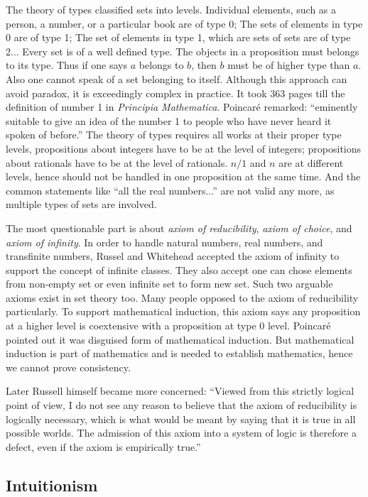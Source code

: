 \documentclass{article}
\begin{document}
The theory of types classified sets into levels. Individual elements, such as a person, a number, or a particular book are of type 0; The sets of elements in type 0 are of type 1; The set of elements in type 1, which are sets of sets are of type 2... Every set is of a well defined type. The objects in a proposition must belongs to its type. Thus if one says $a$ belongs to $b$, then $b$ must be of higher type than $a$. Also one cannot speak of a set belonging to itself. Although this approach can avoid paradox, it is exceedingly complex in practice. It took 363 pages till the definition of number 1 in {\em Principia Mathematica}. Poincaré remarked: ``eminently suitable to give an idea of the number 1 to people who have never heard it spoken of before.'' The theory of types requires all works at their proper type levels, propositions about integers have to be at the level of integers; propositions about rationals have to be at the level of rationals. $n/1$ and $n$ are at different levels, hence should not be handled in one proposition at the same time. And the common statements like ``all the real numbers...'' are not valid any more, as multiple types of sets are involved.

The most questionable part is about {\em axiom of reducibility}, {\em axiom of choice}, and {\em axiom of infinity}. In order to handle natural numbers, real numbers, and transfinite numbers, Russel and Whitehead accepted the axiom of infinity to support the concept of infinite classes. They also accept one can chose elements from non-empty set or even infinite set to form new set. Such two arguable axioms exist in set theory too. Many people opposed to the axiom of reducibility particularly. To support mathematical induction, this axiom says any proposition at a higher level is coextensive with a proposition at type 0 level. Poincaré pointed out it was disguised form of mathematical induction. But mathematical induction is part of mathematics and is needed to establish mathematics, hence we cannot prove consistency.

Later Russell himself became more concerned: ``Viewed from this strictly logical point of view, I do not see any reason to believe that the axiom of reducibility is logically necessary, which is what would be meant by saying that it is true in all possible worlds. The admission of this axiom into a system of logic is therefore a defect, even if the axiom is empirically true.''\cite{M-Kline-2007}

\subsection{Intuitionism}
\end{document}
